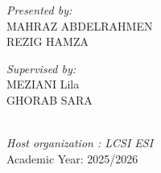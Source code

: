 \begin{titlepage}
\noindent
\begin{minipage}{0.5\textwidth}
    
  \begin{flushleft} \large
    \emph{Presented by:}\\
    MAHRAZ ABDELRAHMEN
    ~\\
    REZIG HAMZA
  \end{flushleft}
\end{minipage}
\begin{minipage}{0.4\textwidth}
  \begin{flushleft} \large
    \emph{Supervised by:} \\
    MEZIANI Lila
    ~\\
     GHORAB SARA
  \end{flushleft}
\end{minipage}\\[0.8cm]

{\large \textit{Host organization : LCSI ESI}}\\[0.8cm]

\vfill
{\large Academic Year: 2025/2026}

\end{titlepage}
